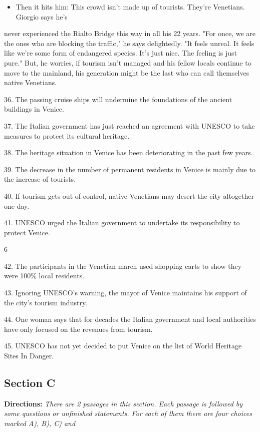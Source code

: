 \documentclass[UTF8,11pt]{ctexart}
\begin{document}
\begin{itemize}[leftmargin=2em,itemsep=.2em,topsep=.4em]\item[N.] Then it hits him: This crowd isn't made up of tourists. They're Venetians. Giorgio says he's
\end{itemize}

never experienced the Rialto Bridge this way in all his 22 years. "For once, we are the ones who are blocking the traffic," he says delightedly. "It feels unreal. It feels like we're some form of endangered species. It's just nice. The feeling is just pure." But, he worries, if tourism isn't managed and his fellow locals continue to move to the mainland, his generation might be the last who can call themselves native Venetians.


36. The passing cruise ships will undermine the foundations of the ancient buildings in Venice.


37. The Italian government has just reached an agreement with UNESCO to take measures to protect its cultural heritage.


38. The heritage situation in Venice has been deteriorating in the past few years.


39. The decrease in the number of permanent residents in Venice is mainly due to the increase of tourists.


40. If tourism gets out of control, native Venetians may desert the city altogether one day.


41. UNESCO urged the Italian government to undertake its responsibility to protect Venice.


6


42. The participants in the Venetian march used shopping carts to show they were 100\% local residents.


43. Ignoring UNESCO's warning, the mayor of Venice maintains his support of the city's tourism industry.


44. One woman says that for decades the Italian government and local authorities have only focused on the revenues from tourism.


45. UNESCO has not yet decided to put Venice on the list of World Heritage Sites In Danger.


\subsection*{\textbf{Section C}}


\textbf{Directions:}\textit{ There are 2 passages in this section. Each passage is followed by some questions} \textit{or unfinished statements. For each of them there are four choices marked A), B), C) and}
\end{document}
